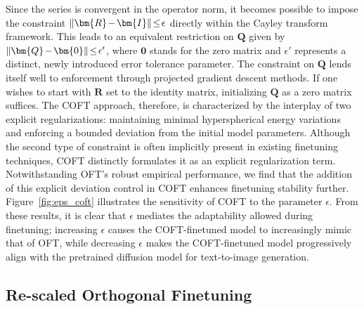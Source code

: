 {Since the series is convergent in the operator norm, it becomes possible to impose the constraint $\thickmuskip=2mu \medmuskip=2mu\|\bm{R}-\bm{I}\|\leq\epsilon$ directly within the Cayley transform framework. This leads to an equivalent restriction on $\bm{Q}$ given by $\thickmuskip=2mu \medmuskip=2mu\|\bm{Q}-\bm{0}\|\leq\epsilon'$, where $\bm{0}$ stands for the zero matrix and $\epsilon'$ represents a distinct, newly introduced error tolerance parameter. The constraint on $\bm{Q}$ lends itself well to enforcement through projected gradient descent methods. If one wishes to start with $\bm{R}$ set to the identity matrix, initializing $\bm{Q}$ as a zero matrix suffices. The COFT approach, therefore, is characterized by the interplay of two explicit regularizations: maintaining minimal hyperspherical energy variations and enforcing a bounded deviation from the initial model parameters. Although the second type of constraint is often implicitly present in existing finetuning techniques, COFT distinctly formulates it as an explicit regularization term. Notwithstanding OFT's robust empirical performance, we find that the addition of this explicit deviation control in COFT enhances finetuning stability further. Figure~\ref{fig:eps_coft} illustrates the sensitivity of COFT to the parameter $\epsilon$. From these results, it is clear that $\epsilon$ mediates the adaptability allowed during finetuning; increasing $\epsilon$ causes the COFT-finetuned model to increasingly mimic that of OFT, while decreasing $\epsilon$ makes the COFT-finetuned model progressively align with the pretrained diffusion model for text-to-image generation.

\subsection{Re-scaled Orthogonal Finetuning}

}
